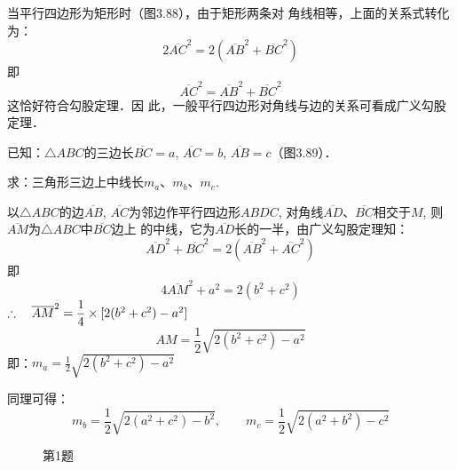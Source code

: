 当平行四边形为矩形时（图3.88），由于矩形两条对
角线相等，上面的关系式转化为：
\[2\overline{AC}^2=2\left(\overline{AB}^2+\overline{BC}^2\right)\]
即
\[\overline{AC}^2=\overline{AB}^2+\overline{BC}^2\]
这恰好符合勾股定理．因
此，一般平行四边形对角线与边的关系可看成广义勾股定理．
    
\begin{example}
    已知：$\triangle ABC$的三边长$\overline{BC}=a$, $\overline{AC}=b$, $\overline{AB}=c$（图3.89）．

求：三角形三边上中线长$m_a$、$m_b$、$m_c$.
\end{example}


\begin{solution}
    以$\triangle ABC$的边$\overline{AB}$, $\overline{AC}$为邻边作平行四边形$ABDC$, 
对角线$\overline{AD}$、$\overline{BC}$相交于$M$, 则$\overline{AM}$为$\triangle ABC$中$\overline{BC}$边上
的中线，它为$\overline{AD}$长的一半，由广义勾股定理知：
\[\overline{AD}^2+\overline{BC}^2=2\left(\overline{AB}^2+\overline{AC}^2\right)\]
即
\[4\overline{AM}^2+a^2=2(b^2+c^2)\]
$\therefore\quad \overline{AM}^2=\dfrac{1}{4}\times [2(b^2+c^2)-a^2]$
\[AM=\frac{1}{2}\sqrt{2(b^2+c^2)-a^2}\]
即：$m_a=\frac{1}{2}\sqrt{2(b^2+c^2)-a^2}$

同理可得：
\[m_b=\frac{1}{2}\sqrt{2(a^2+c^2)-b^2},\qquad m_c=\frac{1}{2}\sqrt{2(a^2+b^2)-c^2}\]
\end{solution}

\begin{figure}[htp]\centering
    \begin{minipage}[t]{0.48\textwidth}
    \centering
{}
    \caption{}
    \end{minipage}
    \begin{minipage}[t]{0.48\textwidth}
    \centering
    \caption*{第1题}
    \end{minipage}
    \end{figure}



